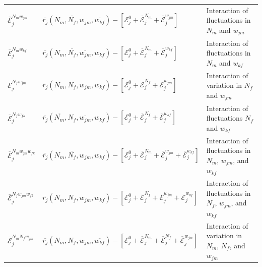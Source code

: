 \documentclass[12pt]{article}
\begin{document}
\begin{table}[h]
{\begin{tabular}{l|l|l}
        $\overline{\mathcal{E}}^{N_{m}w_{jm}}_{j}$ & $\overline{r_{j}}(N_{m}, \overline{N_{f}}, w_{jm}, \overline{w_{kf}})- [\mathcal{E}^{0}_{j} +\overline{\mathcal{E}}^{N_{m}}_j+\overline{\mathcal{E}}^{w_{jm}}_{j}]$  & Interaction of fluctuations in $N_{m}$ and $w_{jm}$ \\


        $\overline{\mathcal{E}}^{N_{m}w_{kf}}_{j}$& $ \overline{r_{j}}(N_{m}, \overline{N_{f}}, \overline{w_{jm}}, w_{kf})- [\mathcal{E}^{0}_{j} +\overline{\mathcal{E}}^{N_{m}}_j+\overline{\mathcal{E}}^{w_{kf}}_{j}]$ & Interaction of fluctuations in $N_{m}$ and $w_{kf}$\\


        $\overline{\mathcal{E}}^{N_{f}w_{jm}}_{j}$& $\overline{r_{j}}(\overline{N_{m}}, N_{f}, w_{jm}, \overline{w_{kf}})- [\mathcal{E}^{0}_{j} +\overline{\mathcal{E}}^{N_{f}}_j+\overline{\mathcal{E}}^{w_{jm}}_{j}]$ & Interaction of variation in $N_{f}$ and $w_{jm}$ \\

        $\overline{\mathcal{E}}^{N_{f}w_{fk}}_{j}$& $ \overline{r_{j}}(\overline{N_{m}}, N_{f}, \overline{w_{jm}}, w_{kf})- [\mathcal{E}^{0}_{j} +\overline{\mathcal{E}}^{N_{f}}_j+\overline{\mathcal{E}}^{w_{kf}}_{j}]$ & Interaction of fluctuations $N_{f}$ and $w_{kf}$ \\


        $\overline{\mathcal{E}}^{N_{m}w_{jm}w_{fk}}_{j}$& $ \overline{r_{j}}(N_{m}, \overline{N_{f}}, w_{jm}, w_{kf})- [\mathcal{E}^{0}_{j} +\overline{\mathcal{E}}^{N_{m}}_{j}+\overline{\mathcal{E}}^{w_{jm}}_j+\overline{\mathcal{E}}^{w_{kf}}_{j}]$  & Interaction of fluctuations in $N_{m}$, $w_{jm}$, and $w_{kf}$ \\

      $\overline{\mathcal{E}}^{N_{f}w_{jm}w_{fk}}_{j}$& $ \overline{r_{j}}(\overline{N_{m}}, N_{f}, w_{jm}, w_{kf})- [\mathcal{E}^{0}_{j} +\overline{\mathcal{E}}^{N_{f}}_{j}+\overline{\mathcal{E}}^{w_{jm}}_j+\overline{\mathcal{E}}^{w_{kf}}_{j}]$ & Interaction of fluctuations in $N_{f}$, $w_{jm}$, and $w_{kf}$ \\

      $\overline{\mathcal{E}}^{N_{m}N_{f}w_{jm}}_{j}$& $ \overline{r_{j}}(N_{m}, N_{f}, w_{jm}, \overline{w_{kf}})- [\mathcal{E}^{0}_{j} +\overline{\mathcal{E}}^{N_{m}}_{j}+\overline{\mathcal{E}}^{N_{f}}_{j}+\overline{\mathcal{E}}^{w_{jm}}_j]$ & Interaction of variation in $N_{m}$, $N_{f}$, and $w_{jm}$ \\




\end{tabular}}
\end{table}
\end{document}
